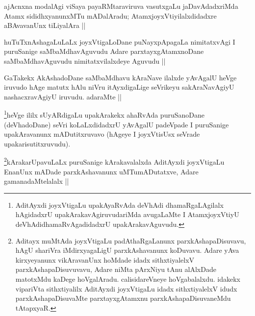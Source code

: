 \begin{artha}
ajAcnxna modalAgi viSaya payaRMtaraviruva vasutxgaLu jaDavAdadxriMda Atamx sididhxyanunxMTu mADalAradu; AtamxjoyxVtiyilalxdidadxre aBAvavanUnx tiLiyalAra ||
\end{artha}

\begin{artha}
huTuTxnAshagaLuLaLx joyxVtigaLoDane puNayxpApagaLa nimitatxvAgi I puruSanige saMbaMdhavAguvudu Adare parxtayxgAtamxnoDane saMbaMdhavAguvudu nimitatxvilalxdeye Aguvudu ||
\end{artha}

\begin{artha}
GaTakekx AkAshadoDane saMbaMdhavu kAraNave ilalxde yAvAgalU heVge iruvudo hAge matutx hAlu niVru itAyxdigaLige seVrikeyu sakAraNavAgiyU nashacxravAgiyU iruvudu. adaraMte ||
\end{artha}

\begin{artha}
\footnote{AditAyxdi joyxVtigaLu upakAyaRvAda deVhAdi dhamaRgaLAgilalx hAgidadxrU upakArakavAgiruvudariMda avugaLaMte I AtamxjoyxVtiyU deVhAdidhamaRvAgadidadxrU upakArakavAguvudu.}heVge ililx sUyARdigaLu upakArakekx ahaRvAda puruSanoDane (deVhadoDane) seVri koLaLxdidadxrU yAvAgalU padeVpade I puruSanige upakAravanunx mADutitxruvavo (hAgeye I joyxVtisUsx seVrade upakarisutitxruvudu).
\end{artha}

\begin{artha}
\footnote{Aditayx muMtAda joyxVtigaLu padAthaRgaLanunx parxkAshapaDisuvavu, hAgU shariVra iMdirxyagaLigU parxkAshavanunx koDuvavu. Adare yAva kirxyeyanunx vikAravanUnx hoMdade idadx sithxtiyalelxV parxkAshapaDisuvuvavu, Adare niMta pArxNiyu tAnu alAlxDade matotxMdu kaDege hoVgalAradu. calisidareVneye hoVgabalalxdu. idakekx vipariVta sithxtiyalilx AditAyxdi joyxVtigaLu idadx sithxtiyalelxV idudx parxkAshapaDisuvaMte parxtayxgAtamxnu parxkAshapaDisuvaneMdu tAtapxyaR.}kArakarUpavuLaLx puruSanige kArakavalalxda AditAyxdi joyxVtigaLu EnanUnx mADade parxkAshavanunx uMTumADutatxve, Adare gamanadaMtelalalx ||
\end{artha}

